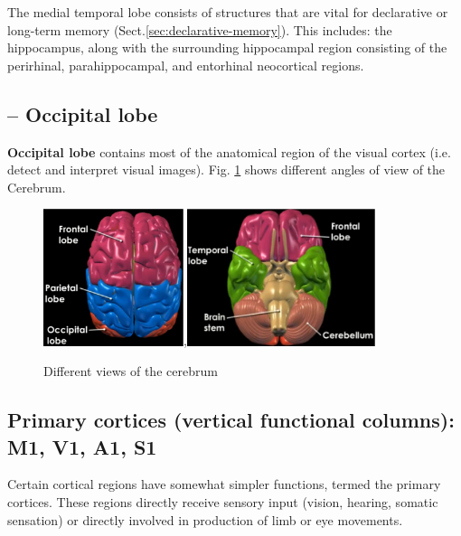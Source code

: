 The medial temporal lobe consists of structures that are vital for declarative
or long-term memory (Sect.\ref{sec:declarative-memory}). This includes: the
hippocampus, along with the surrounding hippocampal region consisting of the
perirhinal, parahippocampal, and entorhinal neocortical regions.



\subsection{-- Occipital lobe}
\label{sec:occipital-lobe}

{\bf Occipital lobe} contains most of the anatomical region of the
visual cortex (i.e. detect and interpret visual images).
Fig. \ref{fig:cerebrum_views} shows different angles of view of the
Cerebrum.

\begin{figure}[hbt]
  \centerline{\includegraphics[height=4cm,
    angle=0]{./images/brain_04.eps},\includegraphics[height=4cm,
    angle=0]{./images/brain_05.eps}}
\caption{Different views of the cerebrum}
\label{fig:cerebrum_views}
\end{figure}

\subsection{Primary cortices (vertical functional columns): M1, V1, A1, S1}

Certain cortical regions have somewhat simpler functions, termed the primary
cortices.  These regions directly receive sensory input (vision, hearing,
somatic sensation) or directly involved in production of limb or eye movements.


